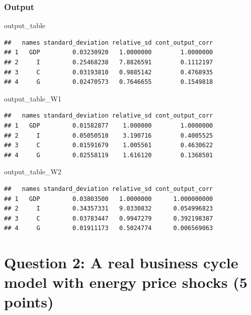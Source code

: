 \documentclass[
]{article}
\newenvironment{Shaded}{\begin{snugshade}}{\end{snugshade}}
\newcommand{\NormalTok}[1]{#1}
\begin{document}
\hypertarget{output}{%
\subsubsection{Output}\label{output}}

\begin{Shaded}
\begin{Highlighting}[]
\NormalTok{output\_table}
\end{Highlighting}
\end{Shaded}

\begin{verbatim}
##   names standard_deviation relative_sd cont_output_corr
## 1   GDP         0.03230920   1.0000000        1.0000000
## 2     I         0.25468238   7.8826591        0.1112197
## 3     C         0.03193810   0.9885142        0.4768935
## 4     G         0.02470573   0.7646655        0.1549818
\end{verbatim}

\begin{Shaded}
\begin{Highlighting}[]
\NormalTok{output\_table\_W1}
\end{Highlighting}
\end{Shaded}

\begin{verbatim}
##   names standard_deviation relative_sd cont_output_corr
## 1   GDP         0.01582877    1.000000        1.0000000
## 2     I         0.05050510    3.190716        0.4005525
## 3     C         0.01591679    1.005561        0.4630622
## 4     G         0.02558119    1.616120        0.1368501
\end{verbatim}

\begin{Shaded}
\begin{Highlighting}[]
\NormalTok{output\_table\_W2}
\end{Highlighting}
\end{Shaded}

\begin{verbatim}
##   names standard_deviation relative_sd cont_output_corr
## 1   GDP         0.03803500   1.0000000      1.000000000
## 2     I         0.34357331   9.0330832      0.054996823
## 3     C         0.03783447   0.9947279      0.392198387
## 4     G         0.01911173   0.5024774      0.006569063
\end{verbatim}

\hypertarget{question-2-a-real-business-cycle-model-with-energy-price-shocks-5-points}{%
\section{Question 2: A real business cycle model with energy price
shocks (5
points)}\label{question-2-a-real-business-cycle-model-with-energy-price-shocks-5-points}}
\end{document}
